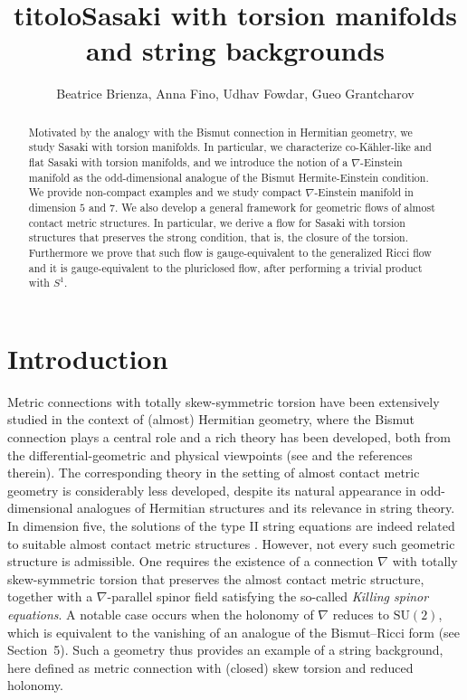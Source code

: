 \documentclass{article}
\title{titolo}
\title{\textbf{Sasaki with torsion manifolds and string backgrounds}}
\author{Beatrice Brienza, Anna Fino, Udhav Fowdar, Gueo Grantcharov}
\date{}
\theoremstyle{definition}
\numberwithin{equation}{section}
\begin{document}
\maketitle

\begin{abstract}
 Motivated by the analogy with the Bismut connection in Hermitian geometry, we study Sasaki with torsion manifolds. In particular, we characterize co-K\"ahler-like and flat Sasaki with torsion manifolds, and we introduce the notion of a $\nabla$-Einstein manifold as the odd-dimensional analogue of the Bismut Hermite-Einstein condition. We provide non-compact examples and we study compact $\nabla$-Einstein manifold in dimension $5$ and $7$. We also develop a general framework for geometric flows of almost contact metric structures. In particular, we derive a flow for Sasaki with torsion structures that preserves the strong condition, that is, the closure of the torsion. Furthermore we prove that such flow is gauge-equivalent to the generalized Ricci flow and it is gauge-equivalent to the pluriclosed flow, after performing a trivial product with $S^1$.


\end{abstract}

\thispagestyle{firstpagefooter}
\tableofcontents



\section{Introduction}

Metric connections with totally skew-symmetric torsion have been extensively studied in the context of (almost) Hermitian geometry, where the Bismut connection plays a central role and a rich theory has been developed, both from the differential-geometric and physical viewpoints (see \cite{Agricola2006,FiGr,GFStr,FI, IP2} and the references therein). The corresponding theory in the setting of almost contact metric geometry is considerably less developed, despite its natural appearance in odd-dimensional analogues of Hermitian structures and its relevance in string theory. In dimension five, the solutions of the type II string equations are indeed related to suitable almost contact metric structures \cite{FI2}. However, not every such geometric structure is admissible. One requires the existence of a connection $\nabla$ with totally skew-symmetric torsion that preserves the almost contact metric structure, together with a $\nabla$-parallel spinor field satisfying the so-called \emph{Killing spinor equations}. A notable case occurs when the holonomy of $\nabla$ reduces to $\mathrm{SU}(2)$, which is equivalent to the vanishing of an analogue of the Bismut--Ricci form (see Section~5). Such a geometry thus provides an example of a string background, here defined as metric connection with (closed) skew torsion and reduced holonomy.
\end{document}
